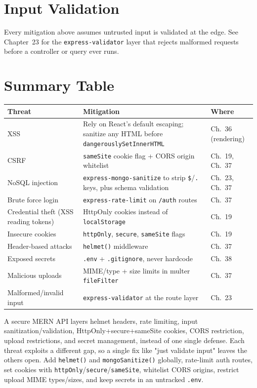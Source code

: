 \section{Input Validation}

Every mitigation above assumes untrusted input is validated at the edge.
See Chapter~23 for the \texttt{express-validator} layer that rejects
malformed requests before a controller or query ever runs.

\section{Summary Table}

\begin{center}
\begin{tabularx}{\textwidth}{p{2.6cm}Xp{2.6cm}}
\toprule
\textbf{Threat} & \textbf{Mitigation} & \textbf{Where} \\
\midrule
XSS & Rely on React's default escaping; sanitize any HTML before \texttt{dangerouslySetInnerHTML} & Ch.~36 (rendering) \\
CSRF & \texttt{sameSite} cookie flag + CORS origin whitelist & Ch.~19, Ch.~37 \\
NoSQL injection & \texttt{express-mongo-sanitize} to strip \texttt{\$}/\texttt{.} keys, plus schema validation & Ch.~23, Ch.~37 \\
Brute force login & \texttt{express-rate-limit} on \texttt{/auth} routes & Ch.~37 \\
Credential theft (XSS reading tokens) & HttpOnly cookies instead of \texttt{localStorage} & Ch.~19 \\
Insecure cookies & \texttt{httpOnly}, \texttt{secure}, \texttt{sameSite} flags & Ch.~19 \\
Header-based attacks & \texttt{helmet()} middleware & Ch.~37 \\
Exposed secrets & \texttt{.env} + \texttt{.gitignore}, never hardcode & Ch.~38 \\
Malicious uploads & MIME/type + size limits in multer \texttt{fileFilter} & Ch.~37 \\
Malformed/invalid input & \texttt{express-validator} at the route layer & Ch.~23 \\
\bottomrule
\end{tabularx}
\end{center}

\whatwhyhow
{A secure MERN API layers helmet headers, rate limiting, input sanitization/validation, HttpOnly+secure+sameSite cookies, CORS restriction, upload restrictions, and secret management, instead of one single defense.}
{Each threat exploits a different gap, so a single fix like "just validate input" leaves the others open.}
{Add \texttt{helmet()} and \texttt{mongoSanitize()} globally, rate-limit auth routes, set cookies with \texttt{httpOnly}/\texttt{secure}/\texttt{sameSite}, whitelist CORS origins, restrict upload MIME types/sizes, and keep secrets in an untracked \texttt{.env}.}
